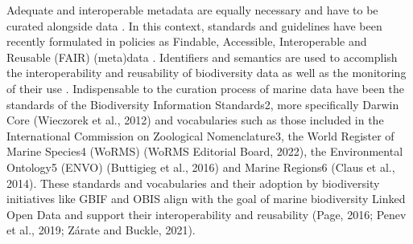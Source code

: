 Adequate and interoperable metadata are equally necessary and have to be
curated alongside data \citep{heidorn_shedding_2008,mouquet_review_2015}.
In this context, standards and guidelines have been recently formulated in 
policies as Findable, Accessible, Interoperable and Reusable (FAIR) 
(meta)data \citep{wilkinson_fair_2016,reiser_fair_2018}. Identifiers and 
semantics are used to accomplish the interoperability and reusability of
biodiversity data as well as the monitoring of their use \citep{mouquet_review_2015}.
Indispensable to the curation process of marine data have been the standards of
the Biodiversity Information Standards2, more specifically Darwin Core (Wieczorek et al., 2012) and vocabularies such as those included in the International Commission on Zoological Nomenclature3, the World Register of Marine Species4 (WoRMS) (WoRMS Editorial Board, 2022), the Environmental Ontology5 (ENVO) (Buttigieg et al., 2016) and Marine Regions6 (Claus et al., 2014). These standards and vocabularies and their adoption by biodiversity initiatives like GBIF and OBIS align with the goal of marine biodiversity Linked Open Data and support their interoperability and reusability (Page, 2016; Penev et al., 2019; Zárate and Buckle, 2021).

